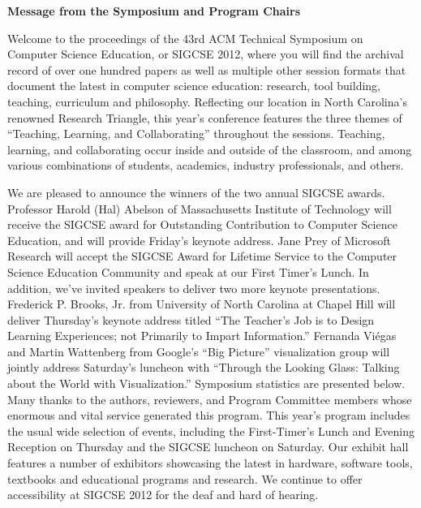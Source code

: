 

% 
\begin{center}
{\Large \textbf{\textsf{Message from the Symposium and Program Chairs}}}
\end{center}


Welcome to the proceedings of the 43rd ACM Technical Symposium on Computer Science Education, or SIGCSE 2012, where you will find the archival record of over one hundred papers as well as multiple other session formats that document the latest in computer science education: research, tool building, teaching, curriculum and philosophy. Reflecting our location in North Carolina’s renowned Research Triangle, this year’s conference features the three themes of “Teaching, Learning, and Collaborating” throughout the sessions. Teaching, learning, and collaborating occur inside and outside of the classroom, and among various combinations of students, academics, industry professionals, and others.
\vspace{0.5\baselineskip}

We are pleased to announce the winners of the two annual SIGCSE awards. Professor Harold (Hal) Abelson of Massachusetts Institute of Technology will receive the SIGCSE award for Outstanding Contribution to Computer Science Education, and will provide Friday’s keynote address. Jane Prey of Microsoft Research will accept the SIGCSE Award for Lifetime Service to the Computer Science Education Community and speak at our First Timer’s Lunch. In addition, we’ve invited speakers to deliver two more keynote presentations. Frederick P. Brooks, Jr. from University of North Carolina at Chapel Hill will deliver Thursday’s keynote address titled “The Teacher’s Job is to Design Learning Experiences; not Primarily to Impart Information.” Fernanda Viégas and Martin Wattenberg from Google’s “Big Picture” visualization group will jointly address Saturday’s luncheon with “Through the Looking Glass: Talking about the World with Visualization.” Symposium statistics are presented below. Many thanks to the authors, reviewers, and Program Committee members whose enormous and vital service generated this program. This year’s program includes the usual wide selection of events, including the First-Timer’s Lunch and Evening Reception on Thursday and the SIGCSE luncheon on Saturday. Our exhibit hall features a number of exhibitors showcasing the latest in hardware, software tools, textbooks and educational programs and research. We continue to offer accessibility at SIGCSE 2012 for the deaf and hard of hearing. 
\vspace{0.5\baselineskip}

